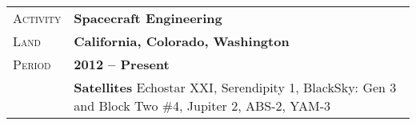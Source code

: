 \documentclass[a4paper, oneside, final]{scrartcl}
\newcommand{\gray}{\rowcolor[gray]{.90}} %
\begin{document}
\begin{center}

\begin{tabularx}{0.97\linewidth}{>{\raggedleft\scshape}p{2cm}X}
\gray Activity & \textbf{Spacecraft Engineering}\\
\gray Land & \textbf{California, Colorado, Washington} \hfill \\
\gray Period & \textbf{2012 -- Present}\\
&
\vspace{-0.15 cm}
 \textbf{Satellites}
 \newline
Echostar XXI, Serendipity 1, BlackSky: Gen 3 and Block Two \#4, Jupiter 2, ABS-2, YAM-3
\\
\end{tabularx}



\end{center}
\end{document}
